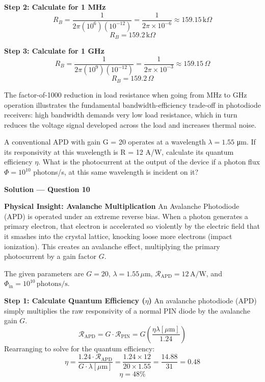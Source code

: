 \textbf{Step 2: Calculate for 1 MHz}
\begin{equation*}
  R_B = \frac{1}{2\pi (10^6) (10^{-12})} = \frac{1}{2\pi \times 10^{-6}} \approx 159.15\,\text{k}\Omega
\end{equation*}
\begin{equation*}
  \boxed{R_B = 159.2\,\text{k}\Omega}
\end{equation*}

\textbf{Step 3: Calculate for 1 GHz}
\begin{equation*}
  R_B = \frac{1}{2\pi (10^9) (10^{-12})} = \frac{1}{2\pi \times 10^{-3}} \approx 159.15\,\Omega
\end{equation*}
\begin{equation*}
  \boxed{R_B = 159.2\,\Omega}
\end{equation*}

The factor-of-1000 reduction in load resistance when going from MHz to GHz operation illustrates the fundamental bandwidth-efficiency trade-off in photodiode receivers: high bandwidth demands very low load resistance, which in turn reduces the voltage signal developed across the load and increases thermal noise.

\begin{question}[Question 10]
A conventional APD with gain G = 20 operates at a wavelength $\lambda = 1.55$ \si{\micro\meter}. If its responsivity at this wavelength is R = 12 A/W, calculate its quantum efficiency $\eta$. What is the photocurrent at the output of the device if a photon flux $\Phi = 10^{10}$ photons/s, at this same wavelength is incident on it?
\end{question}

\textbf{\large Solution --- Question 10}

\textbf{Physical Insight: Avalanche Multiplication}
An Avalanche Photodiode (APD) is operated under an extreme reverse bias. When a photon generates a primary electron, that electron is accelerated so violently by the electric field that it smashes into the crystal lattice, knocking loose more electrons (impact ionization). This creates an avalanche effect, multiplying the primary photocurrent by a gain factor $G$.

The given parameters are $G = 20$, $\lambda = 1.55\,\mu\text{m}$, $\mathcal{R}_{\text{APD}} = 12\,\text{A/W}$, and $\Phi_{\text{in}} = 10^{10}\,\text{photons/s}$.

\textbf{Step 1: Calculate Quantum Efficiency ($\eta$)}
An avalanche photodiode (APD) simply multiplies the raw responsivity of a normal PIN diode by the avalanche gain $G$.
\begin{equation*}
  \mathcal{R}_{\text{APD}} = G \cdot \mathcal{R}_{\text{PIN}} = G \left( \frac{\eta \lambda[\mu\text{m}]}{1.24} \right)
\end{equation*}
Rearranging to solve for the quantum efficiency:
\begin{equation*}
  \eta = \frac{1.24 \cdot \mathcal{R}_{\text{APD}}}{G \cdot \lambda[\mu\text{m}]} = \frac{1.24 \times 12}{20 \times 1.55} = \frac{14.88}{31} = 0.48
\end{equation*}
\begin{equation*}
  \boxed{\eta = 48\%}
\end{equation*}

